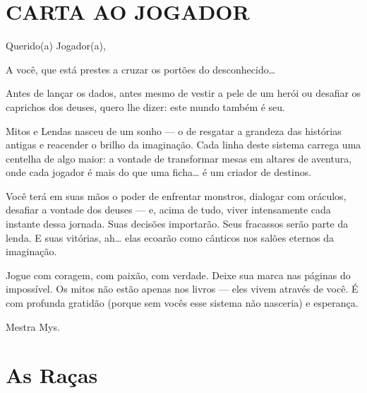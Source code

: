 \begin{Introducao}
\section{CARTA AO JOGADOR}
Querido(a) Jogador(a),

A você, que está prestes a cruzar os portões do desconhecido…

Antes de lançar os dados, antes mesmo de vestir a pele de um herói ou desafiar os caprichos dos deuses, quero lhe dizer: este mundo também é seu.

Mitos e Lendas nasceu de um sonho — o de resgatar a grandeza das histórias antigas e reacender o brilho da imaginação. Cada linha deste sistema carrega uma centelha de algo maior: a vontade de transformar mesas em altares de aventura, onde cada jogador é mais do que uma ficha… é um criador de destinos.

Você terá em suas mãos o poder de enfrentar monstros, dialogar com oráculos, desafiar a vontade dos deuses — e, acima de tudo, viver intensamente cada instante dessa jornada. Suas decisões importarão. Seus fracassos serão parte da lenda. E suas vitórias, ah… elas ecoarão como cânticos nos salões eternos da imaginação.

Jogue com coragem, com paixão, com verdade. Deixe sua marca nas páginas do impossível. Os mitos não estão apenas nos livros — eles vivem através de você. É com profunda gratidão (porque sem vocês esse sistema não nasceria) e esperança.

\begin{flushright}
Mestra Mys.
\end{flushright}

\section{As Raças}

\faceterra

\end{Introducao}



